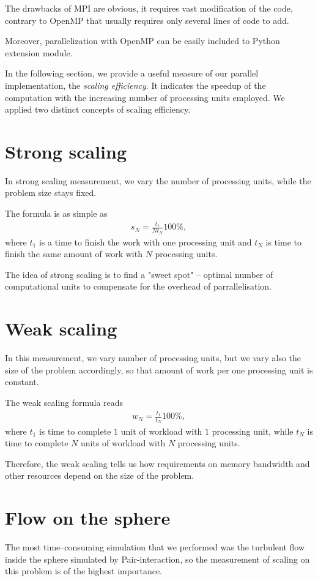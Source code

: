The drawbacks of MPI are obvious, it requires vast modification of the code, contrary to OpenMP that usually requires only several lines of code to add.

Moreover, parallelization with OpenMP can be easily included to Python extension module.

In the following section, we provide a useful measure of our parallel implementation, the \textit{scaling efficiency}. It indicates the speedup of the computation with the increasing number of processing units employed.
We applied two distinct concepts of scaling efficiency.

\section{Strong scaling}
In strong scaling measurement, we vary the number of processing units, while the problem size stays fixed.

The formula is as simple as
\begin{align*}
s_N = \frac{t_1}{N t_N} 100\%,
\end{align*}
where $t_1$ is a time to finish the work with one processing unit and $t_N$ is time to finish the same amount of work with $N$ processing units.

The idea of strong scaling is to find a "sweet spot" -- optimal number of computational units to compensate for the overhead of parrallelisation.
\section{Weak scaling}
In this measurement, we vary number of processing units, but we vary also the size of the problem accordingly, so that amount of work per one processing unit is constant.

The weak scaling formula reads
\begin{align*}
w_N = \frac{t_1}{t_N} 100\%,
\end{align*}
where $t_1$ is time to complete $1$ unit of workload with $1$ processing unit, while $t_N$ is time to complete $N$ units of workload with $N$ processing units.

Therefore, the weak scaling tells us how requirements on memory bandwidth and other resources depend on the size of the problem.

\section{Flow on the sphere}
The most time--consuming simulation that we performed was the turbulent flow inside the sphere simulated by Pair-interaction, so the measurement of scaling on this problem is of the highest importance.

